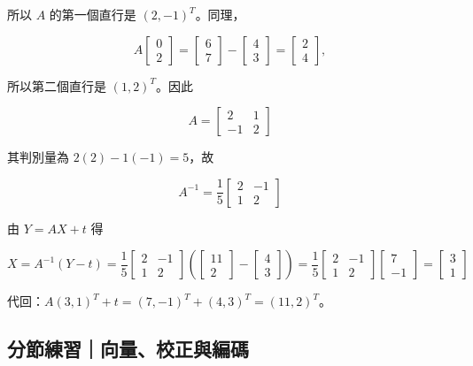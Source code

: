 \documentclass[11pt,a4paper]{article}
\begin{document}
所以 \(A\) 的第一個直行是 \((2,-1)^T\)。同理，

\[
A\begin{bmatrix}0\\2\end{bmatrix}
=\begin{bmatrix}6\\7\end{bmatrix}
-\begin{bmatrix}4\\3\end{bmatrix}
=\begin{bmatrix}2\\4\end{bmatrix},
\]

所以第二個直行是 \((1,2)^T\)。因此

\[
A=\begin{bmatrix}2&1\\-1&2\end{bmatrix}
\]

其判別量為 \(2(2)-1(-1)=5\)，故

\[
A^{-1}=\frac15\begin{bmatrix}2&-1\\1&2\end{bmatrix}
\]

由 \(Y=AX+t\) 得

\[
X=A^{-1}(Y-t)
=\frac15\begin{bmatrix}2&-1\\1&2\end{bmatrix}
\left(
\begin{bmatrix}11\\2\end{bmatrix}
-\begin{bmatrix}4\\3\end{bmatrix}
\right)
=\frac15\begin{bmatrix}2&-1\\1&2\end{bmatrix}
\begin{bmatrix}7\\-1\end{bmatrix}
=\begin{bmatrix}3\\1\end{bmatrix}
\]

代回：\(A(3,1)^T+t=(7,-1)^T+(4,3)^T=(11,2)^T\)。

\subsection{分節練習｜向量、校正與編碼}\label{ux5206ux7bc0ux7df4ux7fd2ux5411ux91cfux6821ux6b63ux8207ux7de8ux78bc}
\end{document}
